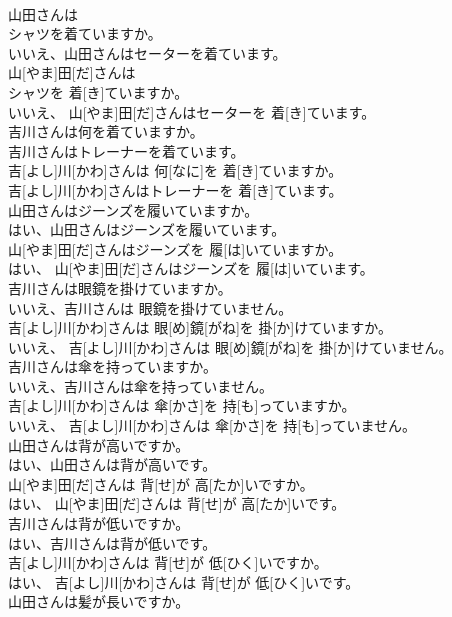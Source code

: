 \documentclass[8pt]{extreport}
\begin{document}
\begin{CJK}{UTF8}{min}
\\	山田さんは
\\	シャツを着ていますか。 
\\	いいえ、山田さんはセーターを着ています。	
\\	山[やま]田[だ]さんは 
\\	シャツを 着[き]ていますか。 
\\	いいえ、 山[やま]田[だ]さんはセーターを 着[き]ています。
\\	吉川さんは何を着ていますか。 
\\	吉川さんはトレーナーを着ています。	
\\	吉[よし]川[かわ]さんは 何[なに]を 着[き]ていますか。 
\\	吉[よし]川[かわ]さんはトレーナーを 着[き]ています。
\\	山田さんはジーンズを履いていますか。 
\\	はい、山田さんはジーンズを履いています。	
\\	山[やま]田[だ]さんはジーンズを 履[は]いていますか。 
\\	はい、 山[やま]田[だ]さんはジーンズを 履[は]いています。
\\	吉川さんは眼鏡を掛けていますか。 
\\	いいえ、吉川さんは 眼鏡を掛けていません。	
\\	吉[よし]川[かわ]さんは 眼[め]鏡[がね]を 掛[か]けていますか。 
\\	いいえ、 吉[よし]川[かわ]さんは 眼[め]鏡[がね]を 掛[か]けていません。
\\	吉川さんは傘を持っていますか。 
\\	いいえ、吉川さんは傘を持っていません。	
\\	吉[よし]川[かわ]さんは 傘[かさ]を 持[も]っていますか。 
\\	いいえ、 吉[よし]川[かわ]さんは 傘[かさ]を 持[も]っていません。
\\	山田さんは背が高いですか。 
\\	はい、山田さんは背が高いです。	
\\	山[やま]田[だ]さんは 背[せ]が 高[たか]いですか。 
\\	はい、 山[やま]田[だ]さんは 背[せ]が 高[たか]いです。
\\	吉川さんは背が低いですか。 
\\	はい、吉川さんは背が低いです。	
\\	吉[よし]川[かわ]さんは 背[せ]が 低[ひく]いですか。 
\\	はい、 吉[よし]川[かわ]さんは 背[せ]が 低[ひく]いです。
\\	山田さんは髪が長いですか。 

\end{CJK}
\end{document}
